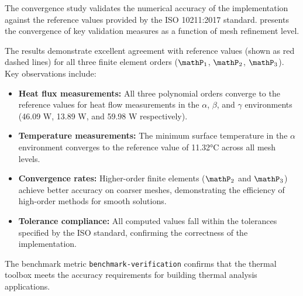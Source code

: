 The convergence study validates the numerical accuracy of the \Feelpp implementation against the reference values provided by the ISO 10211:2017 standard.  presents the convergence of key validation measures as a function of mesh refinement level.

The results demonstrate excellent agreement with reference values (shown as red dashed lines) for all three finite element orders ($\mathP_1$, $\mathP_2$, $\mathP_3$). Key observations include:
\begin{itemize}
\item \textbf{Heat flux measurements:} All three polynomial orders converge to the reference values for heat flow measurements in the $\alpha$, $\beta$, and $\gamma$ environments (46.09 W, 13.89 W, and 59.98 W respectively).
\item \textbf{Temperature measurements:} The minimum surface temperature in the $\alpha$ environment converges to the reference value of 11.32°C across all mesh levels.
\item \textbf{Convergence rates:} Higher-order finite elements ($\mathP_2$ and $\mathP_3$) achieve better accuracy on coarser meshes, demonstrating the efficiency of high-order methods for smooth solutions.
\item \textbf{Tolerance compliance:} All computed values fall within the tolerances specified by the ISO standard, confirming the correctness of the implementation.
\end{itemize}

The benchmark metric \texttt{benchmark-verification} confirms that the \Feelpp thermal toolbox meets the accuracy requirements for building thermal analysis applications.


